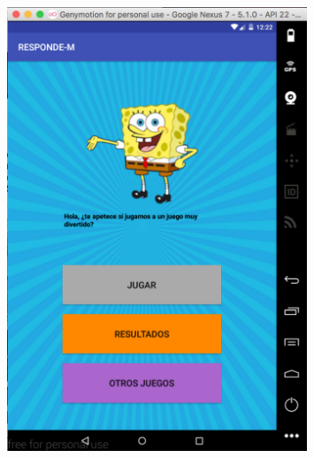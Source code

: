 \documentclass[10pt]{article}
\begin{document}
\begin{figure}[H]
	\begin{center}
 		\includegraphics[width = 0.8\textwidth]{Imagenes/captura1.eps}
	\end{center} 
\end{figure}
\end{document}
